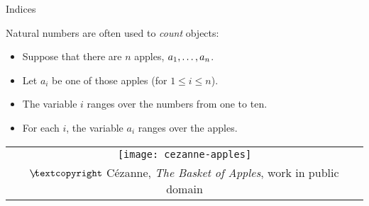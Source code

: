 \documentclass[../slides.tex]{subfiles}
\begin{document}
\begin{frame}{Indices}

Natural numbers are often used to \emph{count} objects:

	\begin{itemize}
	
		\item Suppose that there are $n$ apples, $a_1, \mathellipsis, a_n$.
		
		\item Let $a_i$ be one of those apples (for $1\leq i\leq n$).
		
		\item The variable $i$ ranges over the numbers from one to ten.
		
		\item For each $i$, the variable $a_i$ ranges over the apples.
	
	\end{itemize}
	
	\begin{center}
		\begin{tabular}{c}
		\texttt{[image: cezanne-apples]}\\[-1ex]
		{\tiny $\not\hspace{-1ex}\textcopyright$ C\'ezanne, \emph{The Basket of Apples}, work in public domain}
		\end{tabular}
		\end{center}

\end{frame}
\end{document}
